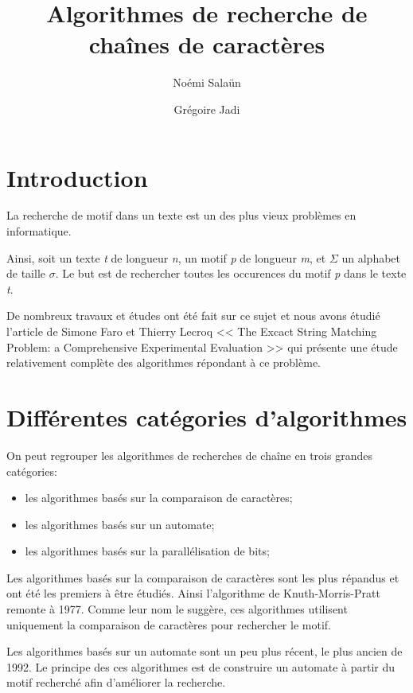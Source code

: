 \documentclass[a4paper,11pt]{article}
\begin{document}
\title{Algorithmes de recherche de chaînes de caractères}
\author{Noémi Salaün \and{} Grégoire Jadi}

\maketitle
\tableofcontents

\section{Introduction}

La recherche de motif dans un texte est un des plus vieux problèmes en informatique.

Ainsi, soit un texte \emph{t} de longueur \emph{n}, un motif \emph{p} de longueur \emph{m}, et $ \Sigma $ un alphabet de taille $ \sigma $. Le but est de rechercher toutes les occurences du motif \emph{p} dans le texte \emph{t}.

De nombreux travaux et études ont été fait sur ce sujet et nous avons étudié l'article de Simone Faro et Thierry Lecroq << The Excact String Matching Problem: a Comprehensive Experimental Evaluation >>\cite{DBLP:journals/corr/abs-1012-2547} qui présente une étude relativement complète des algorithmes répondant à ce problème.

\section{Différentes catégories d'algorithmes}

On peut regrouper les algorithmes de recherches de chaîne en trois grandes catégories:

\begin{itemize}
\item les algorithmes basés sur la comparaison de caractères;
\item les algorithmes basés sur un automate;
\item les algorithmes basés sur la parallélisation de bits;
\end{itemize}

Les algorithmes basés sur la comparaison de caractères sont les plus répandus et ont été les premiers à être étudiés. Ainsi l'algorithme de Knuth-Morris-Pratt remonte à 1977. Comme leur nom le suggère, ces algorithmes utilisent uniquement la comparaison de caractères pour rechercher le motif.

Les algorithmes basés sur un automate sont un peu plus récent, le plus ancien de 1992. Le principe des ces algorithmes est de construire un automate à partir du motif recherché afin d'améliorer la recherche.
\end{document}
